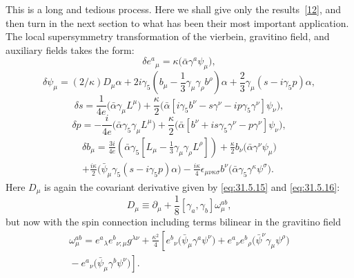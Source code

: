 This is a long and tedious process. Here we shall give only the
results~\hyperref[ch31-ref-12]{[12]}, and then turn in the next section
to what has been their most important application. The local
supersymmetry transformation of the vierbein, gravitino field, and
auxiliary fields takes the form:
\begin{equation}
  \delta e^a{}_\mu
  =\kappa\bigl(\bar\alpha\gamma^a\psi_\mu\bigr),
  \tag{31.6.1}\label{eq:31.6.1}
\end{equation}
\begin{equation}
  \delta\psi_\mu
  =(2/\kappa)D_\mu\alpha
  +2i\gamma_5\left(
    b_\mu-\frac{1}{3}\gamma_\mu\gamma_\rho b^\rho\right)\alpha
  +\frac{2}{3}\gamma_\mu(s-i\gamma_5p)\alpha,
  \tag{31.6.2}\label{eq:31.6.2}
\end{equation}
\begin{equation}
  \delta s
  =\frac{1}{4e}\bigl(\bar\alpha\gamma_\mu L^\mu\bigr)
  +\frac{\kappa}{2}
   \bigl(\bar\alpha
   [i\gamma_5b^\nu-s\gamma^\nu-ip\gamma_5\gamma^\nu]\psi_\nu\bigr),
  \tag{31.6.3}\label{eq:31.6.3}
\end{equation}
\begin{equation}
  \delta p
  =-\frac{i}{4e}\bigl(\bar\alpha\gamma_5\gamma_\mu L^\mu\bigr)
  +\frac{\kappa}{2}
   \bigl(\bar\alpha
   [b^\nu+is\gamma_5\gamma^\nu-p\gamma^\nu]\psi_\nu\bigr),
  \tag{31.6.4}\label{eq:31.6.4}
\end{equation}
\begin{multline}
  \delta b_\mu
  =\frac{3i}{4e}
    \left(\bar\alpha\gamma_5
      \left[L_\mu-\frac{1}{3}\gamma_\mu\gamma_\rho L^\rho\right]\right)
  +\frac{\kappa}{2}b_\nu
    \bigl(\bar\alpha\gamma^\nu\psi_\mu\bigr)\\
  +\frac{i\kappa}{2}
    \bigl(\bar\psi_\mu\gamma_5(s-i\gamma_5p)\alpha\bigr)
  -\frac{i\kappa}{4}\epsilon_{\mu\nu\kappa\sigma}b^\nu
    \bigl(\bar\alpha\gamma_5\gamma^\kappa\psi^\sigma\bigr).
  \tag{31.6.5}\label{eq:31.6.5}
\end{multline}
Here \(D_\mu\) is again the covariant derivative given by
\eqref{eq:31.5.15} and \eqref{eq:31.5.16}:
\begin{equation}
  D_\mu\equiv
  \partial_\mu+\frac{1}{8}[\gamma_a,\gamma_b]\omega_\mu^{ab},
  \tag{31.6.6}\label{eq:31.6.6}
\end{equation}
but now with the spin connection including terms bilinear in the
gravitino field
\begin{multline}
  \omega_\mu^{ab}
  =e^a{}_\lambda e^b{}_{\nu;\mu}g^{\lambda\nu}
  +\frac{\kappa^2}{4}\left[
    e^b{}_\nu\bigl(\bar\psi_\mu\gamma^a\psi^\nu\bigr)
    +e^a{}_\nu e^b{}_\rho
      \bigl(\bar\psi^\nu\gamma_\mu\psi^\rho\bigr)\right.\\
  \left.
    {}-e^a{}_\nu\bigl(\bar\psi_\mu\gamma^b\psi^\nu\bigr)
  \right].
  \tag{31.6.7}\label{eq:31.6.7}
\end{multline}
